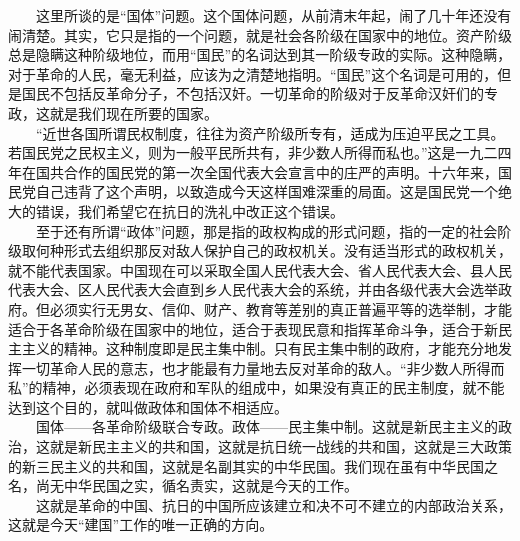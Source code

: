 \documentclass[cn,11pt,chinese]{elegantbook}
\begin{document}
　　这里所谈的是“国体”问题。这个国体问题，从前清末年起，闹了几十年还没有闹清楚。其实，它只是指的一个问题，就是社会各阶级在国家中的地位。资产阶级总是隐瞒这种阶级地位，而用“国民”的名词达到其一阶级专政的实际。这种隐瞒，对于革命的人民，毫无利益，应该为之清楚地指明。“国民”这个名词是可用的，但是国民不包括反革命分子，不包括汉奸。一切革命的阶级对于反革命汉奸们的专政，这就是我们现在所要的国家。\\
　　“近世各国所谓民权制度，往往为资产阶级所专有，适成为压迫平民之工具。若国民党之民权主义，则为一般平民所共有，非少数人所得而私也。”这是一九二四年在国共合作的国民党的第一次全国代表大会宣言中的庄严的声明。十六年来，国民党自己违背了这个声明，以致造成今天这样国难深重的局面。这是国民党一个绝大的错误，我们希望它在抗日的洗礼中改正这个错误。\\
　　至于还有所谓“政体”问题，那是指的政权构成的形式问题，指的一定的社会阶级取何种形式去组织那反对敌人保护自己的政权机关。没有适当形式的政权机关，就不能代表国家。中国现在可以采取全国人民代表大会、省人民代表大会、县人民代表大会、区人民代表大会直到乡人民代表大会的系统，并由各级代表大会选举政府。但必须实行无男女、信仰、财产、教育等差别的真正普遍平等的选举制，才能适合于各革命阶级在国家中的地位，适合于表现民意和指挥革命斗争，适合于新民主主义的精神。这种制度即是民主集中制。只有民主集中制的政府，才能充分地发挥一切革命人民的意志，也才能最有力量地去反对革命的敌人。“非少数人所得而私”的精神，必须表现在政府和军队的组成中，如果没有真正的民主制度，就不能达到这个目的，就叫做政体和国体不相适应。\\
　　国体——各革命阶级联合专政。政体——民主集中制。这就是新民主主义的政治，这就是新民主主义的共和国，这就是抗日统一战线的共和国，这就是三大政策的新三民主义的共和国，这就是名副其实的中华民国。我们现在虽有中华民国之名，尚无中华民国之实，循名责实，这就是今天的工作。\\
　　这就是革命的中国、抗日的中国所应该建立和决不可不建立的内部政治关系，这就是今天“建国”工作的唯一正确的方向。\\
\end{document}
